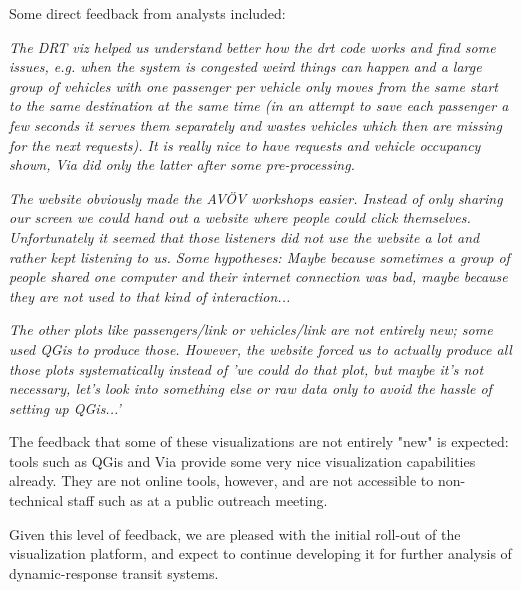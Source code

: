 Some direct feedback from analysts included:

\small{

\begin{displayquote}\emph{
  The DRT viz helped us understand better how the drt code works and find some issues, e.g. when the system is congested weird things can happen and a large group of vehicles with one passenger per vehicle only moves from the same start to the same destination at the same time (in an attempt to save each passenger a few seconds it serves them separately and wastes vehicles which then are missing for the next requests). It is really nice to have requests and vehicle occupancy shown, Via did only the latter after some pre-processing.
}\end{displayquote}

\begin{displayquote}\emph{
  The website obviously made the AVÖV workshops easier. Instead of only sharing our screen we could hand out a website where people could click themselves. Unfortunately it seemed that those listeners did not use the website a lot and rather kept listening to us. Some hypotheses: Maybe because sometimes a group of people shared one computer and their internet connection was bad, maybe because they are not used to that kind of interaction...
}\end{displayquote}

\begin{displayquote}\emph{
  The other plots like passengers/link or vehicles/link are not entirely new; some used QGis to produce those. However, the website forced us to actually produce all those plots systematically instead of 'we could do that plot, but maybe it's not necessary, let's look into something else or raw data only to avoid the hassle of setting up QGis...'
}\end{displayquote}

}

The feedback that some of these visualizations are not entirely "new" is expected: tools such as QGis and Via provide some very nice visualization capabilities already. They are not online tools, however, and are not accessible to non-technical staff such as at a public outreach meeting.

Given this level of feedback, we are pleased with the initial roll-out of the visualization platform, and expect to continue developing it for further analysis of dynamic-response transit systems.

